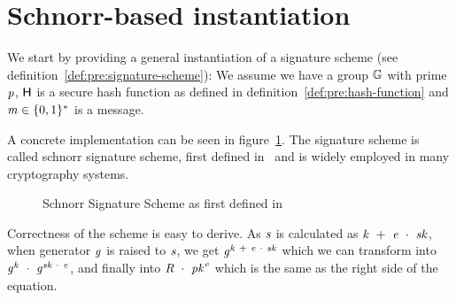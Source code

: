 \section{Schnorr-based instantiation} \label{sec:sig:schnorr-inst}

We start by providing a general instantiation of a signature scheme (see definition~\ref{def:pre:signature-scheme}):
We assume we have a group $\mathbb{G}$ with prime $\mathit{p}$, $\mathsf{H}$ is a secure hash function as defined in definition~\ref{def:pre:hash-function} and $\mathit{m} \in \{0,1\}^{*}$ is a message.


A concrete implementation can be seen in figure~\ref{fig:schnorr}. The signature scheme is called schnorr signature scheme, first defined in~\cite{schnorr1989efficient} and is widely employed in many cryptography systems.
\begin{figure}
    \begin{center}
        \fbox{
        \begin{varwidth}{\textwidth}
            \procedure[linenumbering]{$\procSetup{\varSecParam}$} {
            \varKey \sample \cnstIntegersPrimeWithoutZero{\varPrime} \\
            \pcreturn (\varSecKey \opAssign \varKey \opSeperate \varPubKey \opAssign \funGen{\varKey})
            }
            \procedure[linenumbering]{$\procSign{\varMsg}{\varSecKey}$}{
            \varNonce \sample \cnstIntegersPrimeWithoutZero{\varPrime} \\
            \varRand \opAssign \funGen{\varNonce} \\
            \varSchnorrChallenge \opAssign \funHash{\varMsg \opConc \varRand \opConc \varPubKey} \\
            \varS \opAssign \varNonce \opAddScalar \varSchnorrChallenge \opTimesScalar \varSecKey \\
            \pcreturn \varSignature \opAssign (\varS, \varRand)
            }
            \procedure[linenumbering]{$\procVerf{\varMsg}{\varSignature}{\varPubKey}$} {
            (\varS \opSeperate \varRand) \opFunResult \varSignature \\
            \varSchnorrChallenge \opAssign \funHash{\varMsg \opConc \varRand \opConc \varPubKey} \\
            \pcreturn \funGen{\varS} \opEq \varRand \opAddPoint \opPointScalar{\varPubKey}{\varSchnorrChallenge}
            }
        \end{varwidth}
        }
    \end{center}
    \caption{Schnorr Signature Scheme as first defined in~\cite{schnorr1989efficient}}
    \label{fig:schnorr}
\end{figure}
Correctness of the scheme is easy to derive. As $\mathit{s}$ is calculated as $\mathit{k} ~+~ \mathit{e} ~\cdot~ \mathit{sk}$, when generator $\mathit{g}$ is raised to $\mathit{s}$, we get
$\mathit{g}^{\mathit{k} ~+~ \mathit{e} ~\cdot~ \mathit{sk}}$ which we can transform into $\mathit{g}^{\mathit{k}} ~\cdot~ \mathit{g}^{\mathit{sk} ~\cdot~ \mathit{e}}$, and finally
into $\mathit{R} ~\cdot~ \mathit{pk}^{\mathit{e}}$ which is the same as the right side of the equation.

